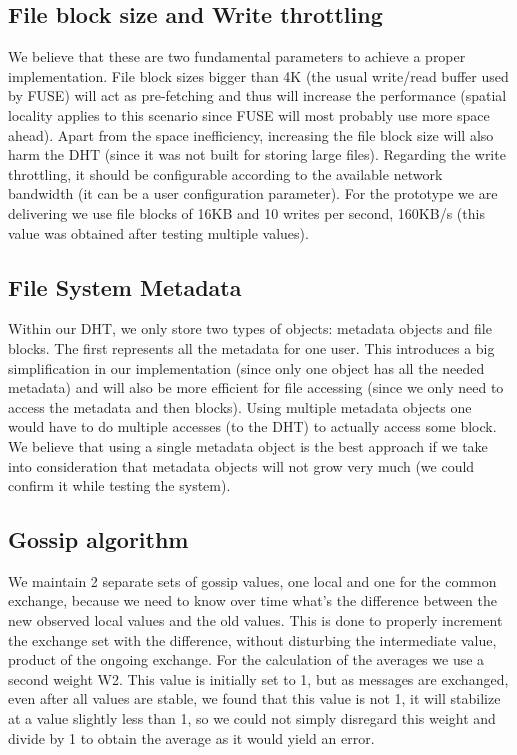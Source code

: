 \documentclass[times,9pt,article]{llncs}
\begin{document}
\subsection{File block size and Write throttling}
We believe that these are two fundamental parameters to achieve a proper implementation. File block sizes bigger than 4K (the usual write/read buffer used by FUSE) will act as pre-fetching and thus will increase the performance (spatial locality applies to this scenario since FUSE will most probably use more space ahead). Apart from the space inefficiency, increasing the file block size will also harm the DHT (since it was not built for storing large files). Regarding the write throttling, it should be configurable according to the available network bandwidth (it can be a user configuration parameter). For the prototype we are delivering we use file blocks of 16KB and 10 writes per second, 160KB/s (this value was obtained after testing multiple values).

\subsection{File System Metadata}
Within our DHT, we only store two types of objects: metadata objects and file blocks. The first represents all the metadata for one user. This introduces a big simplification in our implementation (since only one object has all the needed metadata) and will also be more efficient for file accessing (since we only need to access the metadata and then blocks). Using multiple metadata objects one would have to do multiple accesses (to the DHT) to actually access some block. We believe that using a single metadata object is the best approach if we take into consideration that metadata objects will not grow very much (we could confirm it while testing the system).

\subsection{Gossip algorithm}
We maintain 2 separate sets of gossip values, one local and one for the common exchange, because we need to know over time what's the difference between the new observed local values and the old values. This is done to properly increment the exchange set with the difference, without disturbing the intermediate value, product of the ongoing exchange.
For the calculation of the averages we use a second weight W2. This value is initially set to 1, but as messages are exchanged, even after all values are stable, we found that this value is not 1, it will stabilize at a value slightly less than 1, so we could not simply disregard this weight and divide by 1 to obtain the average as it would yield an error.\\
\end{document}
